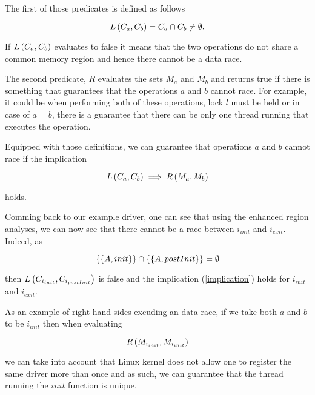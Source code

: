 \documentclass[..thesis.tex]{subfiles}
\begin{document}
The first of those predicates is defined as follows

\begin{equation*}
L \left( C_a, C_b \right) =  C_a \cap C_b \neq \emptyset \text{.}
\end{equation*}

If $L \left( C_a, C_b \right)$ evaluates to false it means that the two operations do not share a common memory region and hence there cannot be a data race. 

The second predicate, $R$ evaluates the sets $M_a$ and $M_b$ and returns true if there is something that guarantees that the operations $a$ and $b$ cannot race. For example, it could be when performing both of these operations, lock $l$ must be held or in case of $a=b$, there is a guarantee that there can be only one thread running that executes the operation.

Equipped with those definitions, we can guarantee that operations $a$ and $b$ cannot race if the implication

\begin{equation}
\label{implication}
L \left( C_a, C_b \right) \implies R \left( M_a, M_b \right)  
\end{equation}

holds.

Comming back to our example driver, one can see that using the enhanced region analyses, we can now see that there cannot be a race between $i_{init}$ and $i_{exit}$. Indeed, as


\begin{equation*}
 \left\lbrace \left\lbrace A, init \right\rbrace \right\rbrace \cap  \left\lbrace \left\lbrace A, postInit \right\rbrace \right\rbrace = \emptyset
\end{equation*}

then $L \left( C_{i_{init}}, C_{i_{postInit}} \right)$ is false and the implication (\ref{implication}) holds for $i_{init}$ and $i_{exit}$.

As an example of right hand sides excuding an data race, if we take both $a$ and $b$ to be $i_{init}$ then when evaluating 

\begin{equation*}
R \left( M_{i_{init}}, M_{i_{init}} \right)
\end{equation*} 

we can take into account that Linux kernel does not allow one to register the same driver more than once and as such, we can guarantee that the thread running the $init$ function is unique.
\end{document}
